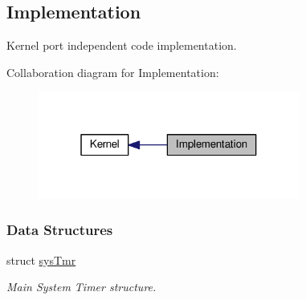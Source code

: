 \hypertarget{group__kern__impl}{\subsection{Implementation}
\label{group__kern__impl}
}


Kernel port independent code implementation.  


Collaboration diagram for Implementation\-:\nopagebreak
\begin{figure}[H]
\begin{center}
\leavevmode
\includegraphics[width=244pt]{group__kern__impl}
\end{center}
\end{figure}
\subsubsection*{Data Structures}
\begin{DoxyCompactItemize}
\item 
struct \hyperlink{structsysTmr}{sys\-Tmr}
\begin{DoxyCompactList}\small\item\em Main System Timer structure. \end{DoxyCompactList}\end{DoxyCompactItemize}

